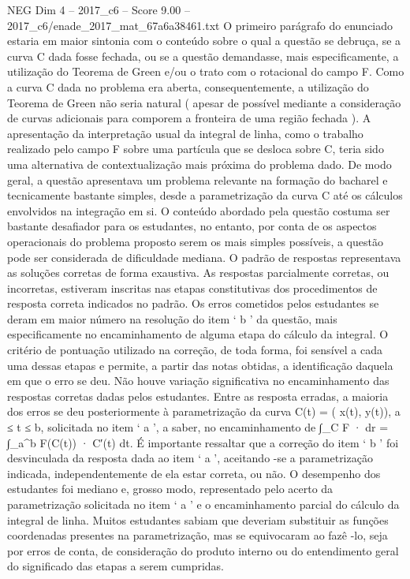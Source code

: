 \begin{textsample}{NEG Dim 4 – 2017\_c6 – Score 9.00 – 2017\_c6/enade\_2017\_mat\_67a6a38461.txt}
O primeiro parágrafo do enunciado estaria em maior sintonia com o conteúdo sobre o qual a questão se debruça, se a curva C dada fosse fechada, ou se a questão demandasse, mais especificamente, a utilização do Teorema de Green e/ou o trato com o rotacional do campo F.
Como a curva C dada no problema era aberta, consequentemente, a utilização do Teorema de Green não seria natural ( apesar de possível mediante a consideração de curvas adicionais para comporem a fronteira de uma região fechada ).
A apresentação da interpretação usual da integral de linha, como o trabalho realizado pelo campo F sobre uma partícula que se desloca sobre C, teria sido uma alternativa de contextualização mais próxima do problema dado.
De modo geral, a questão apresentava um problema relevante na formação do bacharel e tecnicamente bastante simples, desde a parametrização da curva C até os cálculos envolvidos na integração em si.
O conteúdo abordado pela questão costuma ser bastante desafiador para os estudantes, no entanto, por conta de os aspectos operacionais do problema proposto serem os mais simples possíveis, a questão pode ser considerada de dificuldade mediana.
O padrão de respostas representava as soluções corretas de forma exaustiva.
As respostas parcialmente corretas, ou incorretas, estiveram inscritas nas etapas constitutivas dos procedimentos de resposta correta indicados no padrão.
Os erros cometidos pelos estudantes se deram em maior número na resolução do item ‘ b ’ da questão, mais especificamente no encaminhamento de alguma etapa do cálculo da integral.
O critério de pontuação utilizado na correção, de toda forma, foi sensível a cada uma dessas etapas e permite, a partir das notas obtidas, a identificação daquela em que o erro se deu.
Não houve variação significativa no encaminhamento das respostas corretas dadas pelos estudantes.
Entre as resposta erradas, a maioria dos erros se deu posteriormente à parametrização da curva C(t) = ( x(t), y(t)), a ≤ t ≤ b, solicitada no item ‘ a ’, a saber, no encaminhamento de ∫\_C F · dr = ∫\_a\textasciicircum{}b F(C(t)) · C′(t) dt.
É importante ressaltar que a correção do item ‘ b ’ foi desvinculada da resposta dada ao item ‘ a ’, aceitando -se a parametrização indicada, independentemente de ela estar correta, ou não.
O desempenho dos estudantes foi mediano e, grosso modo, representado pelo acerto da parametrização solicitada no item ‘ a ’ e o encaminhamento parcial do cálculo da integral de linha.
Muitos estudantes sabiam que deveriam substituir as funções coordenadas presentes na parametrização, mas se equivocaram ao fazê -lo, seja por erros de conta, de consideração do produto interno ou do entendimento geral do significado das etapas a serem cumpridas.

\end{textsample}
